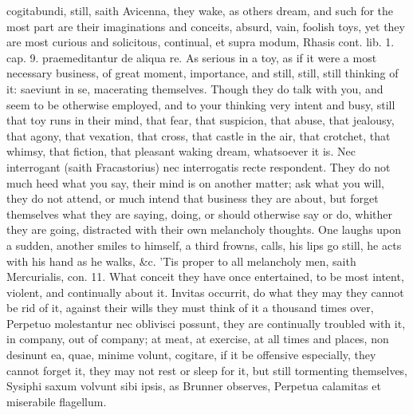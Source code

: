 {cogitabundi, still, saith Avicenna, they wake, as others dream, and
such for the most part are their imaginations and conceits,
absurd, vain, foolish toys, yet they are most curious and
solicitous, continual, et supra modum, Rhasis cont. lib. 1. cap. 9.
praemeditantur de aliqua re. As serious in a toy, as if it were a most
necessary business, of great moment, importance, and still, still,
still thinking of it: saeviunt in se, macerating themselves. Though
they do talk with you, and seem to be otherwise employed, and to your
thinking very intent and busy, still that toy runs in their mind, that
fear, that suspicion, that abuse, that jealousy, that agony, that
vexation, that cross, that castle in the air, that crotchet, that
whimsy, that fiction, that pleasant waking dream, whatsoever it is. Nec
interrogant (saith Fracastorius) nec interrogatis recte
respondent. They do not much heed what you say, their mind is on
another matter; ask what you will, they do not attend, or much intend
that business they are about, but forget themselves what they are
saying, doing, or should otherwise say or do, whither they are going,
distracted with their own melancholy thoughts. One laughs upon a
sudden, another smiles to himself, a third frowns, calls, his lips go
still, he acts with his hand as he walks, \&c. 'Tis proper to all
melancholy men, saith Mercurialis, con. 11. What conceit they
have once entertained, to be most intent, violent, and continually
about it. Invitas occurrit, do what they may they cannot be rid of it,
against their wills they must think of it a thousand times over,
Perpetuo molestantur nec oblivisci possunt, they are continually
troubled with it, in company, out of company; at meat, at exercise, at
all times and places, non desinunt ea, quae, minime volunt,
cogitare, if it be offensive especially, they cannot forget it, they
may not rest or sleep for it, but still tormenting themselves, Sysiphi
saxum volvunt sibi ipsis, as Brunner observes, Perpetua calamitas
et miserabile flagellum.

}
